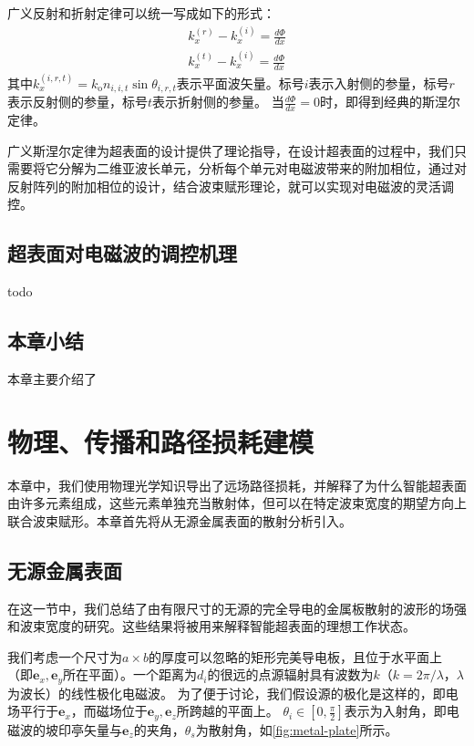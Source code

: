 \documentclass[supercite]{HustGraduPaper}
\begin{document}
广义反射和折射定律可以统一写成如下的形式\cite{ding2017gradient}：
\begin{eqnarray}
	k_{x}^{(r)}-k_{x}^{(i)}=\frac{d \Phi}{d x} \\
	k_{x}^{(t)}-k_{x}^{(i)}=\frac{d \Phi}{d x}
\end{eqnarray}
其中$k_{x}^{(i, r, t)}=k_{\mathrm{o}} n_{i, i, t} \sin \theta_{i, r, t}$表示平面波矢量。标号$i$表示入射侧的参量，标号$r$表示反射侧的参量，标号$t$表示折射侧的参量。
当$\frac{d \Phi}{d x}=0$时，即得到经典的斯涅尔定律。

广义斯涅尔定律为超表面的设计提供了理论指导，在设计超表面的过程中，我们只需要将它分解为二维亚波长单元，分析每个单元对电磁波带来的附加相位，通过对反射阵列的附加相位的设计，结合波束赋形理论，就可以实现对电磁波的灵活调控。

\subsection{超表面对电磁波的调控机理}

todo



\subsection{本章小结}

本章主要介绍了

\section{物理、传播和路径损耗建模}\label{sec:modeling}

本章中，我们使用物理光学知识导出了远场路径损耗\cite{emil2019intelligent}，并解释了为什么智能超表面由许多元素组成，这些元素单独充当散射体，但可以在特定波束宽度的期望方向上联合波束赋形。本章首先将从无源金属表面的散射分析引入。

\subsection{无源金属表面}\label{subsec:metal-plate}

在这一节中，我们总结了由有限尺寸的无源的完全导电的金属板散射的波形的场强和波束宽度的研究。这些结果将被用来解释智能超表面的理想工作状态。

我们考虑一个尺寸为$a \times b$的厚度可以忽略的矩形完美导电板，且位于水平面上（即$\boldsymbol{e}_{x}, \boldsymbol{e}_{y}$所在平面）。一个距离为$d_i$的很远的点源辐射具有波数为$k$（$k = 2\pi / \lambda$，$\lambda$为波长）的线性极化电磁波。
为了便于讨论，我们假设源的极化是这样的，即电场平行于$\boldsymbol{e}_{x}$，而磁场位于$\boldsymbol{e}_{y}, \boldsymbol{e}_{z}$所跨越的平面上。
$\theta_{i} \in\left[0, \frac{\pi}{2}\right]$表示为入射角，即电磁波的坡印亭矢量与$\boldsymbol{e}_{z}$的夹角，$\theta_{s}$为散射角，如\autoref{fig:metal-plate}所示。
\end{document}
